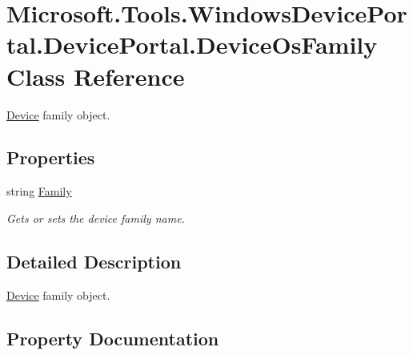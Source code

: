 \hypertarget{class_microsoft_1_1_tools_1_1_windows_device_portal_1_1_device_portal_1_1_device_os_family}{}\section{Microsoft.\+Tools.\+Windows\+Device\+Portal.\+Device\+Portal.\+Device\+Os\+Family Class Reference}
\label{class_microsoft_1_1_tools_1_1_windows_device_portal_1_1_device_portal_1_1_device_os_family}


\hyperlink{class_microsoft_1_1_tools_1_1_windows_device_portal_1_1_device_portal_1_1_device}{Device} family object.  


\subsection*{Properties}
\begin{DoxyCompactItemize}
\item 
string \hyperlink{class_microsoft_1_1_tools_1_1_windows_device_portal_1_1_device_portal_1_1_device_os_family_a4e7fd94ca487b03c57a4e97d41469d8f}{Family}
\begin{DoxyCompactList}\small\item\em Gets or sets the device family name. \end{DoxyCompactList}\end{DoxyCompactItemize}


\subsection{Detailed Description}
\hyperlink{class_microsoft_1_1_tools_1_1_windows_device_portal_1_1_device_portal_1_1_device}{Device} family object. 



\subsection{Property Documentation}
